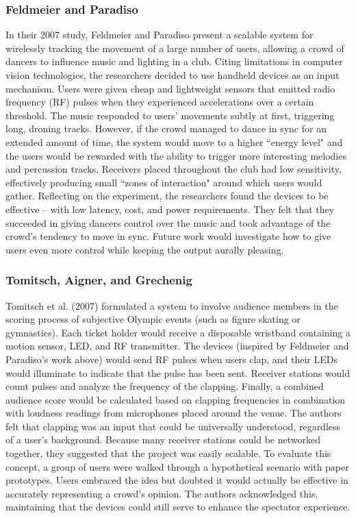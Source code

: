 \subsubsection{Feldmeier and Paradiso}

In their 2007 study, Feldmeier and Paradiso present a scalable system for wirelessly tracking the movement of a large number of users, allowing a crowd of dancers to influence music and lighting in a club. Citing limitations in computer vision technologies, the researchers decided to use handheld devices as an input mechanism. Users were given cheap and lightweight sensors that emitted radio frequency (RF) pulses when they experienced accelerations over a certain threshold. The music responded to users' movements subtly at first, triggering long, droning tracks. However, if the crowd managed to dance in sync for an extended amount of time, the system would move to a higher ``energy level" and the users would be rewarded with the ability to trigger more interesting melodies and percussion tracks. Receivers placed throughout the club had low sensitivity, effectively producing small ``zones of interaction" around which users would gather. Reflecting on the experiment, the researchers found the devices to be effective -- with low latency, cost, and power requirements. They felt that they succeeded in giving dancers control over the music and took advantage of the crowd's tendency to move in sync. Future work would investigate how to give users even more control while keeping the output aurally pleasing.

\subsubsection{Tomitsch, Aigner, and Grechenig}

Tomitsch et al. (2007) formulated a system to involve audience members in the scoring process of subjective Olympic events (such as figure skating or gymnastics). Each ticket holder would receive a disposable wristband containing a motion sensor, LED, and RF transmitter. The devices (inspired by Feldmeier and Paradiso's work above) would send RF pulses when users clap, and their LEDs would illuminate to indicate that the pulse has been sent. Receiver stations would count pulses and analyze the frequency of the clapping. Finally, a combined audience score would be calculated based on clapping frequencies in combination with loudness readings from microphones placed around the venue. The authors felt that clapping was an input that could be universally understood, regardless of a user's background. Because many receiver stations could be networked together, they suggested that the project was easily scalable. To evaluate this concept, a group of users were walked through a hypothetical scenario with paper prototypes. Users embraced the idea but doubted it would actually be effective in accurately representing a crowd's opinion. The authors acknowledged this, maintaining that the devices could still serve to enhance the spectator experience.

